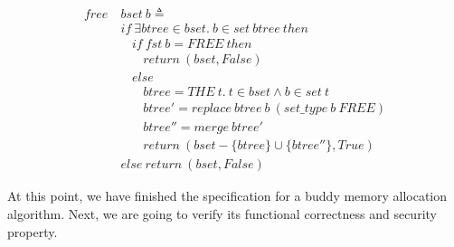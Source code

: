\begin{definition} 
\end{definition}
\vspace{-7pt}
{\footnotesize
\begin{align*}
free\ &bset\ b \triangleq \\
&if\ \exists btree \in bset.\ b \in set\ btree\ then \\
&\ \ \ \ if\ fst\ b = FREE\ then \\
&\ \ \ \ \ \ \ \ return\ (bset, False) \\
&\ \ \ \ else \\
&\ \ \ \ \ \ \ \ btree = THE\ t.\ t \in bset \wedge b \in set\ t \\
&\ \ \ \ \ \ \ \ btree' = replace\ btree\ b\ (set\_type\ b\ FREE) \\
&\ \ \ \ \ \ \ \ btree'' = merge\ btree' \\
&\ \ \ \ \ \ \ \ return\ (bset - \lbrace btree \rbrace \cup \lbrace btree'' \rbrace, True) \\
&else\ return\ (bset, False)
\end{align*}
}
\vspace{-12pt}

At this point, we have finished the specification for a buddy memory allocation algorithm. Next, we are going to verify its functional correctness and security property.